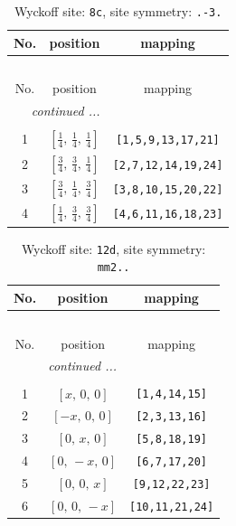 \documentclass[fleqn,8pt]{jsarticle}
\begin{document}
\renewcommand{\arraystretch}{1.2}
\begin{longtable}{ccc}
\caption{Wyckoff site: {\tt 8c}, site symmetry: {\tt .-3.}}
 \\
 \hline \hline
No. & position & mapping \\ \hline \endfirsthead

\multicolumn{2}{l}{\tablename\ \thetable{}} \\
 \hline \hline
No. & position & mapping \\ \hline \endhead

 \hline \hline
\multicolumn{2}{r}{\footnotesize\it continued ...} \\ \endfoot

 \hline \hline
\multicolumn{2}{r}{} \\ \endlastfoot

1 & $\left[ \frac{1}{4},\, \frac{1}{4},\, \frac{1}{4} \right]$ & {\tt [1,5,9,13,17,21]} \\ \hline
2 & $\left[ \frac{3}{4},\, \frac{3}{4},\, \frac{1}{4} \right]$ & {\tt [2,7,12,14,19,24]} \\ \hline
3 & $\left[ \frac{3}{4},\, \frac{1}{4},\, \frac{3}{4} \right]$ & {\tt [3,8,10,15,20,22]} \\ \hline
4 & $\left[ \frac{1}{4},\, \frac{3}{4},\, \frac{3}{4} \right]$ & {\tt [4,6,11,16,18,23]} \\
\end{longtable}
\renewcommand{\arraystretch}{1.2}
\begin{longtable}{ccc}
\caption{Wyckoff site: {\tt 12d}, site symmetry: {\tt mm2..}}
 \\
 \hline \hline
No. & position & mapping \\ \hline \endfirsthead

\multicolumn{2}{l}{\tablename\ \thetable{}} \\
 \hline \hline
No. & position & mapping \\ \hline \endhead

 \hline \hline
\multicolumn{2}{r}{\footnotesize\it continued ...} \\ \endfoot

 \hline \hline
\multicolumn{2}{r}{} \\ \endlastfoot

1 & $\left[ x,\, 0,\, 0 \right]$ & {\tt [1,4,14,15]} \\ \hline
2 & $\left[ - x,\, 0,\, 0 \right]$ & {\tt [2,3,13,16]} \\ \hline
3 & $\left[ 0,\, x,\, 0 \right]$ & {\tt [5,8,18,19]} \\ \hline
4 & $\left[ 0,\, - x,\, 0 \right]$ & {\tt [6,7,17,20]} \\ \hline
5 & $\left[ 0,\, 0,\, x \right]$ & {\tt [9,12,22,23]} \\ \hline
6 & $\left[ 0,\, 0,\, - x \right]$ & {\tt [10,11,21,24]} \\
\end{longtable}
\end{document}
